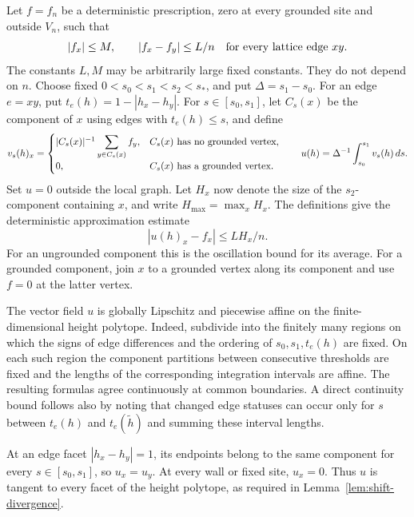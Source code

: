 Let $f=f_n$ be a deterministic prescription, zero at every grounded site
and outside $V_n$, such that
\begin{equation}\label{eq:shift-prescription}
 |f_x|\leq M,\qquad |f_x-f_y|\leq L/n
 \quad\hbox{for every lattice edge }xy.
\end{equation}
The constants $L,M$ may be arbitrarily large fixed constants. They do not
depend on $n$. Choose fixed
$0<s_0<s_1<s_2<s_*$, and put $\Delta=s_1-s_0$.
For an edge $e=xy$, put $t_e(h)=1-|h_x-h_y|$.
For $s\in[s_0,s_1]$, let $C_s(x)$ be the component of $x$ using edges
with $t_e(h)\leq s$, and define
\[
 v_s(h)_x=
 \begin{cases}
  |C_s(x)|^{-1}\displaystyle\sum_{y\in C_s(x)}f_y,
       & C_s(x)\hbox{ has no grounded vertex},\\
  0,   & C_s(x)\hbox{ has a grounded vertex}.
 \end{cases}
 \qquad
 u(h)=\Delta^{-1}\int_{s_0}^{s_1}v_s(h)\,ds.
\]
Set $u=0$ outside the local graph. Let $H_x$ now denote the size of the
$s_2$-component containing $x$, and write $H_{\max}=\max_x H_x$.
The definitions give the deterministic approximation estimate
\begin{equation}\label{eq:shift-error}
 |u(h)_x-f_x|\leq L H_x/n.
\end{equation}
For an ungrounded component this is the oscillation bound for its average.
For a grounded component, join $x$ to a grounded vertex along its component
and use $f=0$ at the latter vertex.

The vector field $u$ is globally Lipschitz and piecewise affine on the
finite-dimensional height polytope. Indeed, subdivide into the finitely many
regions on which the signs of edge differences and the ordering of
$s_0,s_1,t_e(h)$ are fixed. On each such region the component partitions
between consecutive thresholds are fixed and the lengths of the
corresponding integration intervals are affine. The resulting formulas
agree continuously at common boundaries. A direct continuity bound follows
also by noting that changed edge statuses can occur only for $s$ between
$t_e(h)$ and $t_e(\widetilde h)$ and summing these interval lengths.

At an edge facet $|h_x-h_y|=1$, its endpoints belong to the same component
for every $s\in[s_0,s_1]$, so $u_x=u_y$. At every wall or fixed site,
$u_x=0$. Thus $u$ is tangent to every facet of the height polytope, as
required in Lemma~\ref{lem:shift-divergence}.

